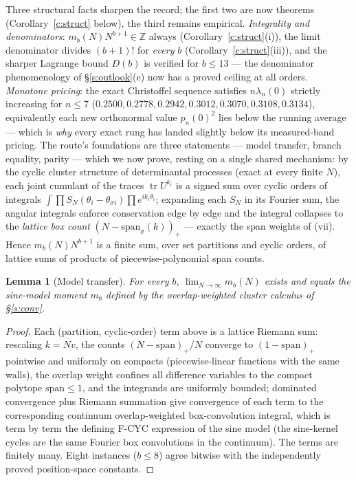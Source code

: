 \documentclass[11pt]{article}
\numberwithin{equation}{section}
\newtheorem{lemma}[theorem]{Lemma}
\theoremstyle{definition}
\theoremstyle{remark}
\begin{document}
Three structural facts sharpen the record; the first two are
now theorems (Corollary~\ref{c:struct} below), the third
remains empirical. \emph{Integrality
and denominators}: $m_b(N)N^{b+1}\in\mathbb Z$ always
(Corollary~\ref{c:struct}(i)), the limit denominator divides
$(b{+}1)!$ for \emph{every} $b$
(Corollary~\ref{c:struct}(iii)), and the sharper Lagrange
bound $D(b)$ is verified for $b\le13$ --- the denominator
phenomenology of \S\ref{s:outlook}(e) now has a proved
ceiling at all orders.
\emph{Monotone pricing}: the exact Christoffel sequence
satisfies $n\lambda_n(0)$ strictly increasing for
$n\le7$ ($0.2500,0.2778,0.2942,0.3012,0.3070,0.3108,0.3134$),
equivalently each new orthonormal value $p_n(0)^2$ lies below
the running average --- which is \emph{why} every exact rung
has landed slightly below its measured-band pricing.
The route's foundations are three statements --- model
transfer, branch equality, parity --- which we now prove,
resting on a single shared mechanism: by the cyclic cluster
structure of determinantal processes \cite{Sos00} (exact at
every finite $N$), each joint cumulant of the traces
$\operatorname{tr}U^{k_i}$ is a signed sum over cyclic orders
of integrals $\int\prod S_N(\theta_i-\theta_{\sigma i})
\prod e^{ik_i\theta_i}$; expanding each $S_N$ in its Fourier
sum, the angular integrals enforce conservation edge by edge
and the integral collapses to the \emph{lattice box count}
$(N-\mathrm{span}_\sigma(k))_+$ --- exactly the span weights
of (vii). Hence $m_b(N)N^{b+1}$ is a finite sum, over set
partitions and cyclic orders, of lattice sums of products of
piecewise-polynomial span counts.

\begin{lemma}[Model transfer]\label{l:transfer}
For every $b$, $\lim_{N\to\infty}m_b(N)$ exists and equals
the sine-model moment $m_b$ defined by the overlap-weighted
cluster calculus of \S\ref{s:conv}.
\end{lemma}

\begin{proof}
Each (partition, cyclic-order) term above is a lattice
Riemann sum: rescaling $k=Nv$, the counts $(N-\mathrm{span})_+/N$
converge to $(1-\mathrm{span})_+$ pointwise and uniformly on
compacts (piecewise-linear functions with the same walls), the
overlap weight confines all difference variables to the
compact polytope $\mathrm{span}\le1$, and the integrands are
uniformly bounded; dominated convergence plus Riemann
summation give convergence of each term to the corresponding
continuum overlap-weighted box-convolution integral, which is
term by term the defining F-CYC expression of the sine model
(the sine-kernel cycles are the same Fourier box convolutions
in the continuum). The terms are finitely many. Eight
instances ($b\le8$) agree bitwise with the independently
proved position-space constants.
\end{proof}
\end{document}
